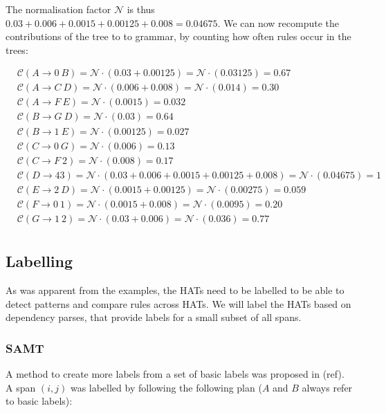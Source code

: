 \documentclass{article}
\newcommand{\N}{\mathcal{N}}
\begin{document}
\noindent The normalisation factor $\N$ is thus $0.03+0.006+0.0015+0.00125+0.008 = 0.04675$. We can now recompute the contributions of the tree to to grammar, by counting how often rules occur in the trees:

\begin{align*}
&\mathcal{C}(A\rightarrow 0~B) = \N\cdot(0.03 + 0.00125) = \N\cdot(0.03125) = 0.67\\
&\mathcal{C}(A\rightarrow C~D) = \N\cdot(0.006 + 0.008) = \N\cdot(0.014) = 0.30\\
&\mathcal{C}(A\rightarrow F~E) = \N\cdot(0.0015)= 0.032 \\
&\mathcal{C}(B \rightarrow G~D) = \N\cdot(0.03)= 0.64\\
&\mathcal{C}(B \rightarrow 1~E) = \N\cdot(0.00125) = 0.027\\
&\mathcal{C}(C \rightarrow 0~G) = \N\cdot(0.006) = 0.13\\
&\mathcal{C}(C \rightarrow F~2) = \N\cdot(0.008) = 0.17\\
&\mathcal{C}(D\rightarrow 4 3) = \N\cdot(0.03 + 0.006 + 0.0015 + 0.00125 + 0.008) = \N\cdot(0.04675) = 1\\
&\mathcal{C}(E\rightarrow 2~D) = \N\cdot(0.0015 + 0.00125) = \N\cdot(0.00275) = 0.059\\
&\mathcal{C}(F\rightarrow 0~1) = \N\cdot(0.0015 + 0.008) = \N\cdot(0.0095) = 0.20\\
&\mathcal{C}(G\rightarrow 1~2) = \N\cdot(0.03 + 0.006) = \N\cdot(0.036) = 0.77\\
\end{align*}



\subsection{Labelling}

As was apparent from the examples, the HATs need to be labelled to be able to detect patterns and compare rules across HATs. We will label the HATs based on dependency parses, that provide labels for a small subset of all spans.

\subsubsection{SAMT}

A method to create more labels from a set of basic labels was proposed in (ref). A span $(i,j)$ was labelled by following the following plan ($A$ and $B$ always refer to basic labels):
\end{document}
